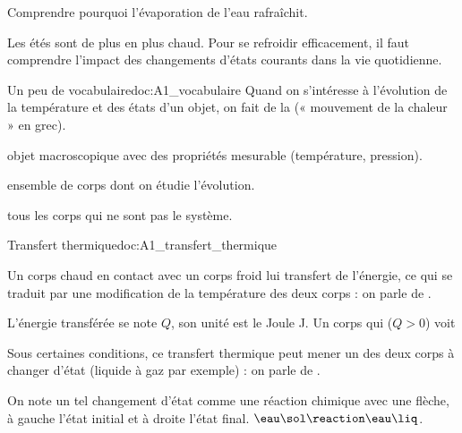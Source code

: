 \teteSndTran

\vspace*{-40pt}

\begin{objectifs}
  \item Comprendre pourquoi l'évaporation de l'eau rafraîchit.
\end{objectifs}

\begin{contexte}
  Les étés sont de plus en plus chaud. Pour se refroidir efficacement, il faut comprendre l'impact des changements d'états courants dans la vie quotidienne.
  
\end{contexte}


\begin{doc}{Un peu de vocabulaire}{doc:A1_vocabulaire}
  Quand on s'intéresse à l'évolution de la température et des états d'un objet, on fait de la  (« mouvement de la chaleur » en grec).
  
  \begin{importants}
    \begin{listePoints}
      \item {} objet macroscopique avec des propriétés mesurable (température, pression).
      \item {} ensemble de corps dont on étudie l'évolution.
      \item {} tous les corps qui ne sont pas le système.
    \end{listePoints}
  \end{importants}
\end{doc}

\begin{doc}{Transfert thermique}{doc:A1_transfert_thermique}
  \begin{importants}
    Un corps chaud en contact avec un corps froid lui transfert de l'énergie, ce qui se traduit par une modification de la température des deux corps : on parle de .
  \end{importants}
  L'énergie transférée se note $Q$, son unité est le Joule \unit{\joule}.
  Un corps qui  ($Q > 0$) voit 
  
  
  \begin{importants}
    Sous certaines conditions, ce transfert thermique peut mener un des deux corps à changer d'état (liquide à gaz par exemple) : on parle de .
  \end{importants}
  On note un tel changement d'état comme une réaction chimique avec une flèche, à gauche l'état initial et à droite l'état final.
  \exemple $\eau\sol \reaction \eau\liq$.
\end{doc}

